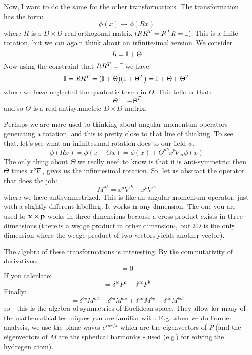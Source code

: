 Now, I want to do the same for the other transformations. The transformation has the form:
\begin{equation}
    \phi(x) \to \phi(Rx)
\end{equation}
where $R$ is a $D \times D$ real orthogonal matrix ($RR^T = R^TR = \mathbb{I}$). This is a finite rotation, but we can again think about an infinitesimal version. We consider:
\begin{equation}
    R = \mathbb{I} + \Theta
\end{equation}
Now using the constraint that $RR^T = \mathbb{I}$ we have:
\begin{equation}
    \mathbb{I} = RR^T = (\mathbb{I} + \Theta)(\mathbb{I} + \Theta^T) = \mathbb{I} + \Theta + \Theta^T
\end{equation}
where we have neglected the quadratic terms in $\Theta$. This tells us that:
\begin{equation}
    \Theta = -\Theta^T
\end{equation}
and so $\Theta$ is a real antisymmetric $D \times D$ matrix.

Perhaps we are more used to thinking about angular momentum operators generating a rotation, and this is pretty close to that line of thinking. To see that, let's see what an infinitesimal rotation does to our field $\phi$.
\begin{equation}
    \phi(Rx) = \phi(x + \Theta x) = \phi(x) + \Theta^{ab}x^b\nabla_a\phi(x)
\end{equation}
The only thing about $\Theta$ we really need to know is that it is anti-symmetric; then $\Theta$ times $x^b\nabla_a$ gives us the infinitesimal rotation. So, let us abstract the operator that does the job:
\begin{equation}
    M^{ab} = x^a\nabla^b - x^b\nabla^a
\end{equation}
where we have antisymmetrized. This is like an angular momentum operator, just with a slightly different labelling. It works in any dimension. The one you are used to $\mathbf{x} \times \mathbf{p}$ works in three dimensions because a cross product exists in three dimensions (there is a wedge product in other dimensions, but 3D is the only dimension where the wedge product of two vectors yields another vector).

The algebra of these transformations is interesting. By the commutativity of derivatives:
\begin{equation}
    [P^a, P^b] = 0
\end{equation}
If you calculate:
\begin{equation}
    [M^{ab}, P^c] = \delta^{bc}P^a - \delta^{ac}P^b
\end{equation}
Finally:
\begin{equation}
    [M^{ab}, M^{cd}] = \delta^{bc}M^{ad} - \delta^{bd}M^{ac} + \delta^{ad}M^{bc} - \delta^{ac}M^{bd}
\end{equation}
so - this is the algebra of symmetries of Euclidean space. They allow for many of the mathematical techniques you are familiar with. E.g. when we do Fourier analysis, we use the plane waves $e^{ipx/\hbar}$ which are the eigenvectors of $P$ (and the eigenvectors of $M$ are the spherical harmonics - used (e.g.) for solving the hydrogen atom).


